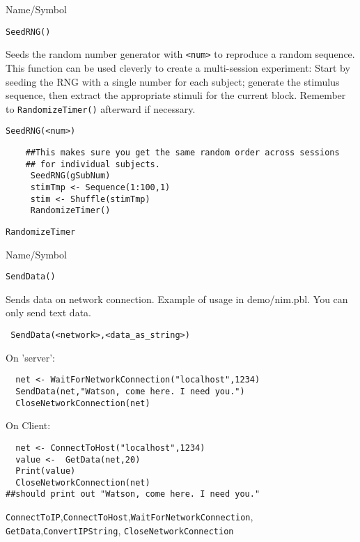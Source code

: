 \begin{desc}{Name/Symbol}
\item[Name/Symbol]   \verb+SeedRNG()+

\item[Description] Seeds the random number generator with \verb+<num>+
  to reproduce a random sequence.  This function can be used cleverly
  to create a multi-session experiment: Start by seeding the RNG with
  a single number for each subject; generate the stimulus sequence,
  then extract the appropriate stimuli for the current block. Remember
  to \verb+RandomizeTimer()+ afterward if necessary.

\item[Usage] 
\begin{verbatim}
SeedRNG(<num>) 
\end{verbatim}

\item[Example]	

\begin{verbatim}
    ##This makes sure you get the same random order across sessions
    ## for individual subjects.
     SeedRNG(gSubNum)
     stimTmp <- Sequence(1:100,1)
     stim <- Shuffle(stimTmp)
     RandomizeTimer()
\end{verbatim}

\item[See Also]	
     \verb+RandomizeTimer+
\end{desc}

\rl

\begin{desc}{Name/Symbol}
\item[Name/Symbol]	\verb+SendData()+

\item[Description]	Sends data on network connection.  Example of
  usage in demo/nim.pbl. You can only send text data.

\item[Usage]
\begin{verbatim}
 SendData(<network>,<data_as_string>)
\end{verbatim}

\item[Example]	

On 'server':
\begin{verbatim}
  net <- WaitForNetworkConnection("localhost",1234)
  SendData(net,"Watson, come here. I need you.")
  CloseNetworkConnection(net)
\end{verbatim}
On Client:
\begin{verbatim}
  net <- ConnectToHost("localhost",1234)
  value <-  GetData(net,20)
  Print(value)
  CloseNetworkConnection(net)
##should print out "Watson, come here. I need you."
\end{verbatim}
\item[See Also]
  \verb+ConnectToIP+,\verb+ConnectToHost+,\verb+WaitForNetworkConnection+,
   \verb+GetData+,\verb+ConvertIPString+, \verb+CloseNetworkConnection+
\end{desc}


